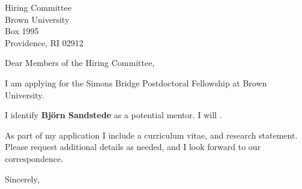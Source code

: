 \documentclass[11pt,a4paper]{letter}
\begin{document}

\def\School{Brown University}

\begin{letter}
{Hiring Committee\\
Brown University\\
Box 1995\\
Providence, RI 02912}


\opening{Dear Members of the Hiring Committee,}

I am applying for the Simons Bridge Postdoctoral Fellowship at \School. 



I identify \textbf{Bj\"{o}rn Sandstede} as a potential mentor. I will .

As part of my application I include a curriculum vitae, and research statement. Please request additional details as needed, and I look forward to our correspondence.

\closing{Sincerely,}
\end{letter}
\end{document}
